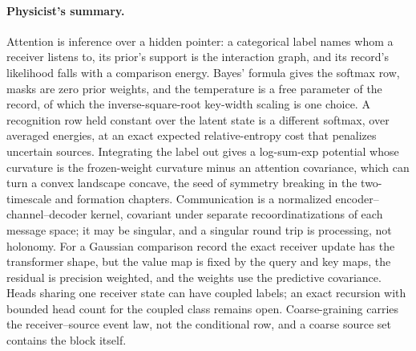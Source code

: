 \paragraph{Physicist's summary.}
Attention is inference over a hidden pointer: a categorical label names whom a
receiver listens to, its prior's support is the interaction graph, and its
record's likelihood falls with a comparison energy. Bayes' formula gives the
softmax row, masks are zero prior weights, and the temperature is a free
parameter of the record, of which the inverse-square-root key-width scaling is
one choice. A recognition row held constant over the latent state is a
different softmax, over averaged energies, at an exact expected
relative-entropy cost that penalizes uncertain sources. Integrating the label
out gives a log-sum-exp potential whose curvature is the frozen-weight
curvature minus an attention covariance, which can turn a convex landscape
concave, the seed of symmetry breaking in the two-timescale and formation
chapters. Communication is a normalized encoder--channel--decoder kernel,
covariant under separate recoordinatizations of each message space; it may be
singular, and a singular round trip is processing, not holonomy. For a Gaussian
comparison record the exact receiver update has the transformer shape, but the
value map is fixed by the query and key maps, the residual is precision
weighted, and the weights use the predictive covariance. Heads sharing one
receiver state can have coupled labels; an exact recursion with bounded
head count for the coupled class remains open.
Coarse-graining carries the receiver--source event law, not the conditional
row, and a coarse source set contains the block itself.
